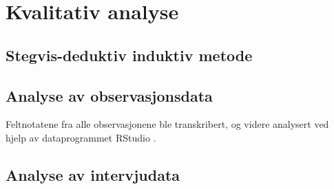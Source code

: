 \section{Kvalitativ analyse}
\label{section:kvalitativ_analyse} 


\subsection{Stegvis-deduktiv induktiv metode}

\subsection{Analyse av observasjonsdata}
Feltnotatene  fra alle observasjonene ble transkribert, og videre analysert ved hjelp av dataprogrammet RStudio \citep{Rstudio}.


\subsection{Analyse av intervjudata}